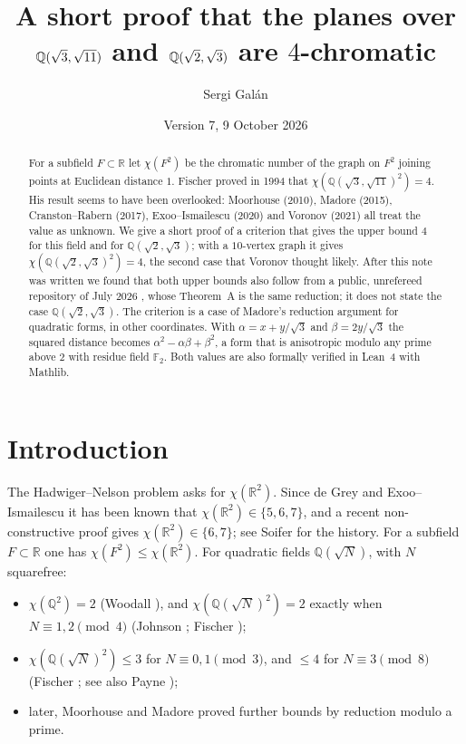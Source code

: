 \documentclass[11pt,a4paper]{amsart}
\title[The planes over $\Q(\sqrt3,\sqrt{11})$ and $\Q(\sqrt2,\sqrt3)$ are $4$-chromatic]{A short proof that the
planes over $\Q(\sqrt3,\sqrt{11})$ and $\Q(\sqrt2,\sqrt3)$ are $4$-chromatic}
\author{Sergi Gal\'an}
\date{Version 7, 9 October 2026}
\theoremstyle{remark}
\newcommand{\F}{\mathbb{F}}
\newcommand{\Q}{\mathbb{Q}}
\newcommand{\R}{\mathbb{R}}
\begin{document}
\begin{abstract}
For a subfield $F\subset\R$ let $\chi(F^2)$ be the chromatic number of the graph on $F^2$ joining points at
Euclidean distance $1$. Fischer proved in 1994 that $\chi(\Q(\sqrt3,\sqrt{11})^2)=4$. His result seems to have
been overlooked: Moorhouse (2010), Madore (2015), Cranston--Rabern (2017), Exoo--Ismailescu (2020) and Voronov
(2021) all treat the value as unknown. We give a short proof of a criterion that gives the upper bound $4$ for
this field and for $\Q(\sqrt2,\sqrt3)$; with a $10$-vertex graph it gives $\chi(\Q(\sqrt2,\sqrt3)^2)=4$, the
second case that Voronov thought likely. After this note was written we found that both upper bounds also follow
from a public, unrefereed repository of July 2026 \cite{MM}, whose Theorem~A is the same reduction; it does not
state the case $\Q(\sqrt2,\sqrt3)$. The criterion is a case of
Madore's reduction argument for quadratic forms, in other coordinates. With $\alpha=x+y/\sqrt3$ and
$\beta=2y/\sqrt3$ the squared distance becomes $\alpha^2-\alpha\beta+\beta^2$, a form that is anisotropic modulo
any prime above $2$ with residue field $\F_2$. Both values are also formally verified in Lean~4 with Mathlib.
\end{abstract}

\maketitle

\section{Introduction}

The Hadwiger--Nelson problem asks for $\chi(\R^2)$. Since de Grey \cite{deGrey} and Exoo--Ismailescu
\cite{ExooIsmailescu} it has been known that $\chi(\R^2)\in\{5,6,7\}$, and a recent non-constructive proof \cite{OpenAI} gives
$\chi(\R^2)\in\{6,7\}$; see Soifer \cite{Soifer} for the history. For a
subfield $F\subset\R$ one has $\chi(F^2)\le\chi(\R^2)$. For quadratic fields $\Q(\sqrt N)$, with $N$ squarefree:
\begin{itemize}
\item $\chi(\Q^2)=2$ (Woodall \cite{Woodall}), and $\chi(\Q(\sqrt N)^2)=2$ exactly when $N\equiv1,2\pmod 4$
(Johnson \cite{Johnson1987}; Fischer \cite[Thm.~8]{Fischer1990});
\item $\chi(\Q(\sqrt N)^2)\le3$ for $N\equiv0,1\pmod 3$, and $\le4$ for $N\equiv3\pmod 8$ (Fischer
\cite[Thms.~9,~10]{Fischer1990}; see also Payne \cite{Payne});
\item later, Moorhouse \cite{Moorhouse} and Madore \cite{Madore} proved further bounds by reduction modulo a
prime.
\end{itemize}
\end{document}
